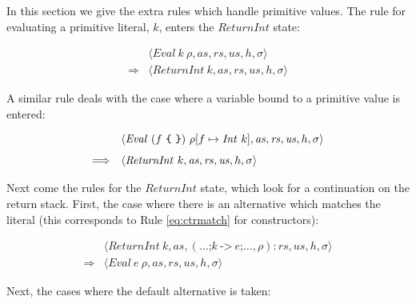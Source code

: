 In this section we give the extra rules which handle primitive values. The rule for evaluating a primitive literal, $k$, enters the $\mathit{ReturnInt}$ state:
\begin{mdframed}
\begin{equation}
\begin{array}{cl}
 & \langle \mathit{Eval}~k~\rho, \mathit{as}, \mathit{rs}, \mathit{us}, h, \sigma \rangle \\[0.25cm]
\Longrightarrow & \langle \mathit{ReturnInt}~k, \mathit{as}, \mathit{rs}, \mathit{us}, h, \sigma \rangle 
\end{array}
\end{equation}
\end{mdframed}
A similar rule deals with the case where a variable bound to a primitive value is entered:
\begin{mdframed}
\begin{equation}
\begin{array}{cl}
 & \langle \mathit{Eval}~(f~\texttt{\{\,\,\}})~\rho[f \mapsto \mathit{Int}~k], \mathit{as}, \mathit{rs}, \mathit{us}, h, \sigma \rangle \\[0.25cm]
\Longrightarrow & \langle \mathit{ReturnInt}~k, \mathit{as}, \mathit{rs}, \mathit{us}, h, \sigma \rangle 
\end{array}
\label{eqn:varint}
\end{equation}
\end{mdframed}
Next come the rules for the $\mathit{ReturnInt}$ state, which look for a continuation on the return stack. First, the case where there is an alternative which matches the literal (this corresponds to Rule \ref{eq:ctrmatch} for constructors):
\begin{mdframed}
\begin{equation}
\begin{array}{cl}
 & \langle \mathit{ReturnInt}~k, \mathit{as}, (\ldots \texttt{;} k~\texttt{->}~e \texttt{;} \ldots, \rho) : \mathit{rs}, \mathit{us}, h, \sigma \rangle \\[0.25cm]
\Longrightarrow & \langle \mathit{Eval}~e~\rho, \mathit{as}, \mathit{rs}, \mathit{us}, h, \sigma \rangle 
\end{array}
\end{equation}
\end{mdframed}
Next, the cases where the default alternative is taken:
